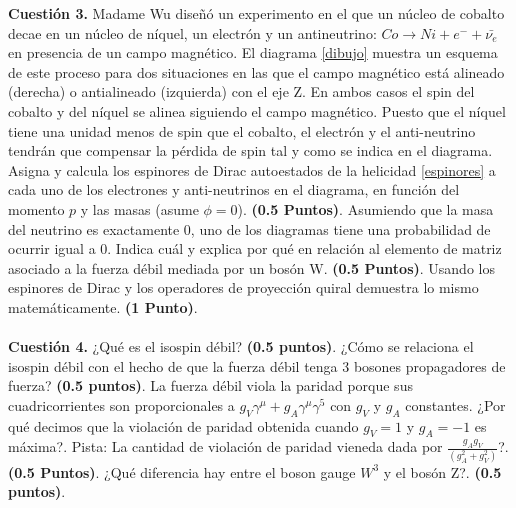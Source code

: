 \documentclass[paper=a4, fontsize=11pt]{scrartcl} %
\numberwithin{equation}{section} %
\numberwithin{figure}{section} %
\numberwithin{table}{section} %
\begin{document}
\textbf{Cuestión 3.} Madame Wu diseñó un experimento en el que un núcleo de cobalto decae en un núcleo de níquel, un electrón y un antineutrino: $Co\rightarrow Ni + e^{-} + \bar{\nu_e}$
en presencia de un campo magnético. El diagrama \ref{dibujo} muestra un esquema de este proceso para dos situaciones en las que el campo magnético está alineado
(derecha) o antialineado (izquierda) con el eje Z. En ambos casos el spin del cobalto y del níquel se alinea siguiendo el campo magnético. Puesto que el níquel tiene
una unidad menos de spin que el cobalto, el electrón y el anti-neutrino tendrán que compensar la pérdida de spin tal y como se indica en el diagrama. Asigna y calcula
los espinores de Dirac autoestados de la helicidad \ref{espinores} a cada uno de los electrones y anti-neutrinos en el diagrama, en función del momento $p$ y las masas
(asume $\phi=0$). \textbf{(0.5 Puntos)}. Asumiendo que la masa del neutrino es exactamente 0, uno de los diagramas tiene una probabilidad de ocurrir igual a 0. Indica
cuál y explica por qué en relación al elemento de matriz asociado a la fuerza débil mediada por un bosón W. \textbf{(0.5 Puntos)}. Usando los espinores de Dirac y los
operadores de proyección quiral demuestra lo mismo matemáticamente. \textbf{(1 Punto)}.
\\
\\
\textbf{Cuestión 4.} ¿Qué es el isospin débil? \textbf{(0.5 puntos)}. ¿Cómo se relaciona el isospin débil con el hecho de que la fuerza débil tenga 3 bosones propagadores 
de fuerza? \textbf{(0.5 puntos)}. La fuerza débil viola la paridad porque sus cuadricorrientes son proporcionales a $g_V \gamma^\mu + g_A \gamma^\mu\gamma^5$ con $g_V$ y
$g_A$ constantes. ¿Por qué decimos que la violación de paridad obtenida cuando $g_V=1$ y $g_A=-1$ es máxima?. Pista: La cantidad de violación de paridad vieneda dada por
$\frac{g_Ag_V}{(g_A^2+g_V^2)}$?.\textbf{(0.5 Puntos)}. ¿Qué diferencia hay entre el boson gauge $W^3$ y el bosón Z?. \textbf{(0.5 puntos)}.
\\
\\
\end{document}

